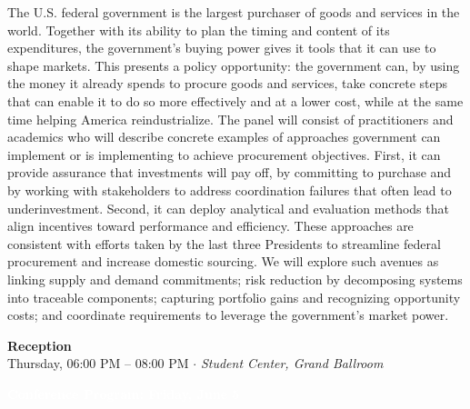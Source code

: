 \documentclass[
  10pt,
  letterpaper,
  DIV=11,
  numbers=noendperiod]{scrartcl}
\begin{document}
The U.S. federal government is the largest purchaser of goods and
services in the world. Together with its ability to plan the timing and
content of its expenditures, the government's buying power gives it
tools that it can use to shape markets. This presents a policy
opportunity: the government can, by using the money it already spends to
procure goods and services, take concrete steps that can enable it to do
so more effectively and at a lower cost, while at the same time helping
America reindustrialize. The panel will consist of practitioners and
academics who will describe concrete examples of approaches government
can implement or is implementing to achieve procurement objectives.
First, it can provide assurance that investments will pay off, by
committing to purchase and by working with stakeholders to address
coordination failures that often lead to underinvestment. Second, it can
deploy analytical and evaluation methods that align incentives toward
performance and efficiency. These approaches are consistent with efforts
taken by the last three Presidents to streamline federal procurement and
increase domestic sourcing. We will explore such avenues as linking
supply and demand commitments; risk reduction by decomposing systems
into traceable components; capturing portfolio gains and recognizing
opportunity costs; and coordinate requirements to leverage the
government's market power.

\vspace{1em}


\begin{center}
\colorbox{event!15}{\parbox{0.9\linewidth}{\centering
  \textcolor{event}{\large\textbf{Reception}}\\[2pt]
  {\small Thursday, 06:00 PM – 08:00 PM $\cdot$ \textit{Student Center, Grand Ballroom}}
}}
\end{center}

\newpage

\markboth{}{}
\noindent\colorbox{event}{\parbox{\dimexpr\linewidth-2\fboxsep}{\centering\textcolor{white}{\large\textbf{Conference Program: Friday, June 5}}}}

\vspace{0.6em}
\end{document}

